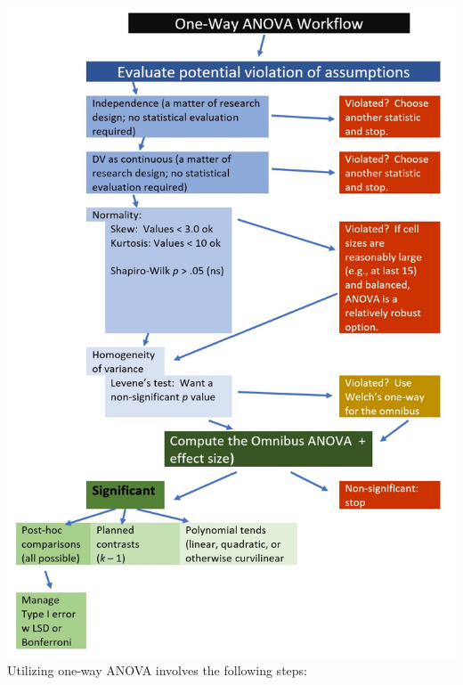 \documentclass[
  11pt,
]{book}
\begin{document}
\includegraphics{images/oneway/OnewayWrkFlw.jpg} Utilizing one-way ANOVA involves the following steps:
\end{document}
